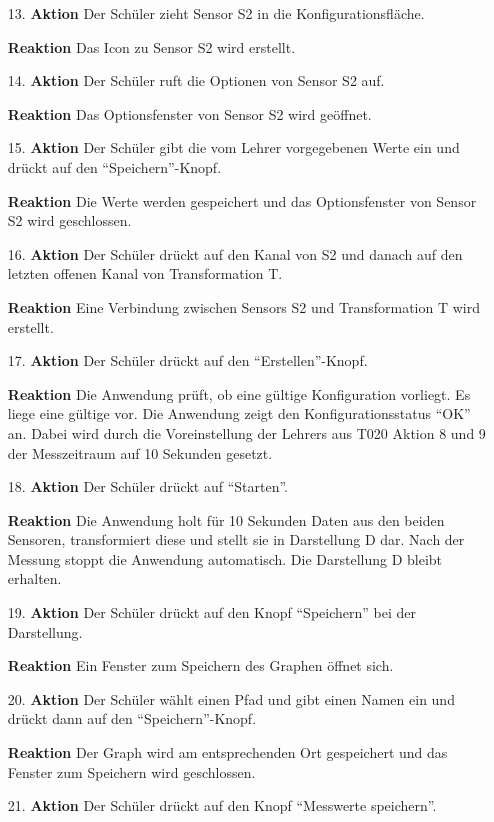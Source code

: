 \documentclass[parskip=full]{scrartcl}
\begin{document}
\begin{itemize}
\begin{itemize}
\item [13.]\textbf{Aktion} Der Schüler zieht Sensor S2 in die Konfigurationsfläche.
\item []\textbf{Reaktion} Das Icon zu Sensor S2 wird erstellt.
\item [14.]\textbf{Aktion} Der Schüler ruft die Optionen von Sensor S2 auf.
\item []\textbf{Reaktion} Das Optionsfenster von Sensor S2 wird geöffnet.
\item [15.]\textbf{Aktion} Der Schüler gibt die vom Lehrer vorgegebenen Werte ein und drückt auf den "`Speichern"'-Knopf.
\item []\textbf{Reaktion} Die Werte werden gespeichert und das Optionsfenster von Sensor S2 wird geschlossen.
\item [16.]\textbf{Aktion} Der Schüler drückt auf den Kanal von S2 und danach auf den letzten offenen Kanal von Transformation T.
\item []\textbf{Reaktion} Eine Verbindung zwischen Sensors S2 und Transformation T wird erstellt.
\item [17.]\textbf{Aktion} Der Schüler drückt auf den "`Erstellen"'-Knopf.
\item []\textbf{Reaktion} Die Anwendung prüft, ob eine gültige Konfiguration vorliegt. Es liege eine gültige vor. Die Anwendung zeigt den Konfigurationsstatus "`OK"' an. Dabei wird durch die Voreinstellung der Lehrers aus T020 Aktion 8 und 9 der Messzeitraum auf 10 Sekunden gesetzt.
\item [18.]\textbf{Aktion} Der Schüler drückt auf "`Starten"'.
\item []\textbf{Reaktion} Die Anwendung holt für 10 Sekunden Daten aus den beiden Sensoren, transformiert diese und stellt sie in Darstellung D dar. Nach der Messung stoppt die Anwendung automatisch. Die Darstellung D bleibt erhalten.
\item [19.]\textbf{Aktion} Der Schüler drückt auf den Knopf "`Speichern"' bei der Darstellung.
\item []\textbf{Reaktion} Ein Fenster zum Speichern des Graphen öffnet sich.
\item [20.]\textbf{Aktion} Der Schüler wählt einen Pfad und gibt einen Namen ein und drückt dann auf den "`Speichern"'-Knopf.
\item []\textbf{Reaktion} Der Graph wird am entsprechenden Ort gespeichert und das Fenster zum Speichern wird geschlossen.
\item [21.]\textbf{Aktion} Der Schüler drückt auf den Knopf "`Messwerte speichern"'.

\end{itemize}
\end{itemize}
\end{document}
